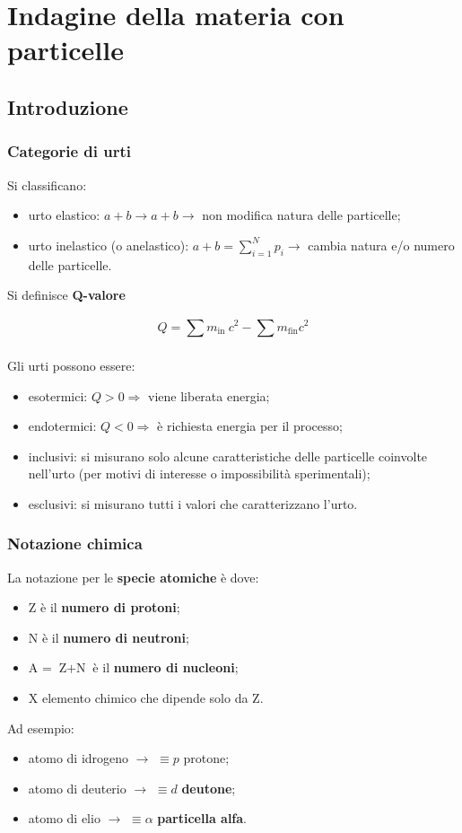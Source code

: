 \documentclass[10pt, a4paper]{scrartcl}
\numberwithin{equation}{subsection}
\theoremstyle{style1}
\newenvironment{boxenv}[1][]{
    \begin{eqbox}[#1]
    }{
   \end{eqbox}
}
\begin{document}
\newpage

\section{Indagine della materia con particelle}
\subsection{Introduzione}
\subsubsection{Categorie di urti}
Si classificano:
\begin{itemize}
	\item urto elastico: $a+b \to a+b \to  $ non modifica natura delle particelle;
	\item urto inelastico (o anelastico): $a+b = \sum_{i=1}^{N} p_i\to $ cambia natura e/o numero delle particelle.
\end{itemize}
Si definisce \textbf{Q-valore} 
\begin{boxenv}[]
\begin{equation}
Q = \sum_{}^{} m_\text{in } c^2 - \sum_{}^{} m_\text{fin}c^2
\end{equation}
\end{boxenv}
\noindent Gli urti possono essere:
\begin{itemize}
	\item esotermici: $Q>0\Rightarrow $ viene liberata energia;
	\item endotermici: $Q<0 \Rightarrow $ \`e richiesta energia per il processo;
	\item inclusivi: si misurano solo alcune caratteristiche delle particelle coinvolte nell'urto (per motivi di interesse o impossibilit\`a sperimentali);
	\item esclusivi: si misurano tutti i valori che caratterizzano l'urto.
\end{itemize}
\subsubsection{Notazione chimica}
La notazione per le \textbf{specie atomiche} \`e  dove:
\begin{itemize}
	\item Z \`e il \textbf{numero di protoni};
	\item N \`e il \textbf{numero di neutroni};
	\item A = $\text{Z}+\text{N}$ \`e il \textbf{numero di nucleoni};
	\item X elemento chimico che dipende solo da Z.
\end{itemize}
Ad esempio:
\begin{itemize}
	\item {} atomo di idrogeno $\rightarrow $  $\equiv p$ protone;
	\item {} atomo di deuterio $\rightarrow$  $\equiv d$ \textbf{deutone};
	\item {} atomo di elio $\rightarrow$  $\equiv \alpha $ \textbf{particella alfa}.
\end{itemize}
\end{document}
